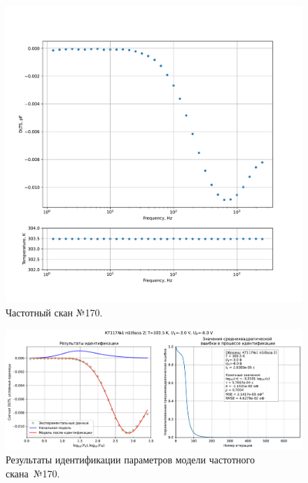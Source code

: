 \begin{figure}[!ht]
    \centering
    \includegraphics[width=1\textwidth]{../plots/КТ117№1_п1(база 2)_2500Гц-1Гц_1пФ_+30С_-3В-8В_200мВ_20мкс_шаг_0,1.pdf}
    \caption{Частотный скан №170.}
    \label{pic:frequency_scan_170}
\end{figure}

\begin{figure}[!ht]
    \centering
    \includegraphics[width=1\textwidth]{../plots/КТ117№1_п1(база 2)_2500Гц-1Гц_1пФ_+30С_-3В-8В_200мВ_20мкс_шаг_0,1_model.pdf}
    \caption{Результаты идентификации параметров модели частотного скана~№170.}
    \label{pic:frequency_scan_model170}
\end{figure}

\pagebreak



